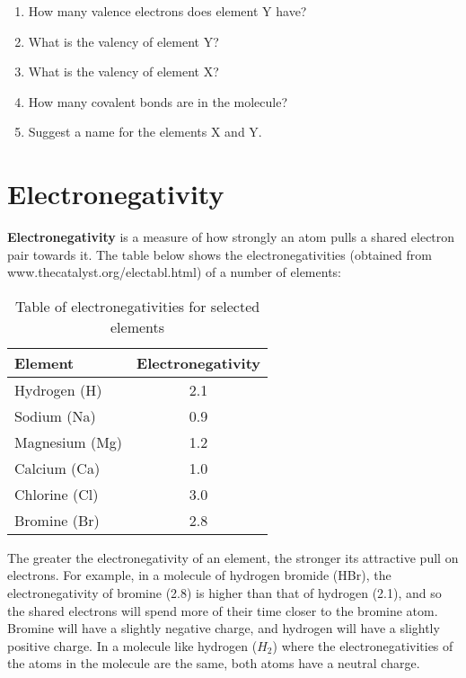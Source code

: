 {\begin{enumerate}
{	\begin{enumerate}
	\item{How many valence electrons does element Y have?}
	\item{What is the valency of element Y?}
	\item{What is the valency of element X?}
	\item{How many covalent bonds are in the molecule?}
	\item{Suggest a name for the elements X and Y.}
	\end{enumerate}
}

\end{enumerate}
}







\section{Electronegativity}

\textbf{Electronegativity} is a measure of how strongly an atom pulls a shared electron pair towards it. The table below shows the electronegativities (obtained from www.thecatalyst.org/electabl.html) of a number of elements:

\begin{table}[!h]
\begin{center}
\caption{Table of electronegativities for selected elements}
\begin{tabular}{|l|c|}\hline
\textbf{Element} & \textbf{Electronegativity}\\\hline
Hydrogen (H) & 2.1\\\hline
Sodium (Na) & 0.9\\\hline
Magnesium (Mg) & 1.2\\\hline
Calcium (Ca) & 1.0\\\hline
Chlorine (Cl) & 3.0\\\hline
Bromine (Br) & 2.8\\\hline
\end{tabular}
\end{center}
\end{table}


The greater the electronegativity of an element, the stronger its attractive pull on electrons. For example, in a molecule of hydrogen bromide (HBr), the electronegativity of bromine (2.8) is higher than that of hydrogen (2.1), and so the shared electrons will spend more of their time closer to the bromine atom. Bromine will have a slightly negative charge, and hydrogen will have a slightly positive charge. In a molecule like hydrogen ($H_{2}$) where the electronegativities of the atoms in the molecule are the same, both atoms have a neutral charge. \\

